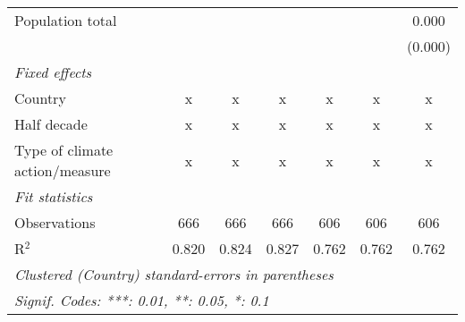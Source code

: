 \begin{tabular}{lcccccc}
   Population total                           &         &               &               &               &               & 0.000\\   
                                              &         &               &               &               &               & (0.000)\\   
   \emph{Fixed effects}\\
   Country                                    & x       & x             & x             & x             & x             & x\\  
   Half decade                                & x       & x             & x             & x             & x             & x\\  
   Type of climate action/measure             & x       & x             & x             & x             & x             & x\\  
   \midrule \emph{Fit statistics}\\
   Observations                               & 666     & 666           & 666           & 606           & 606           & 606\\  
   R$^2$                                      & 0.820   & 0.824         & 0.827         & 0.762         & 0.762         & 0.762\\  
   \midrule
   \multicolumn{7}{l}{\emph{Clustered (Country) standard-errors in parentheses}}\\
   \multicolumn{7}{l}{\emph{Signif. Codes: ***: 0.01, **: 0.05, *: 0.1}}\\
\end{tabular}
\par\endgroup


